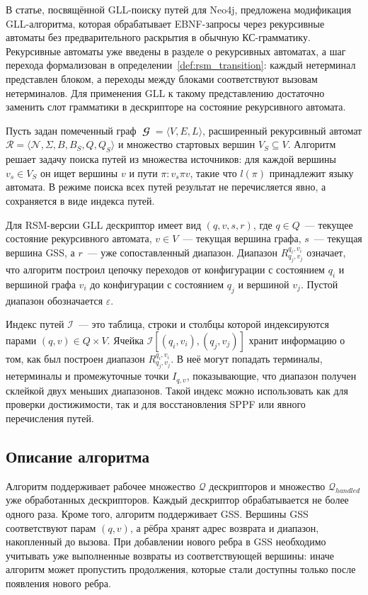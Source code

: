 В статье, посвящённой GLL-поиску путей для Neo4j, предложена модификация GLL-алгоритма, которая обрабатывает EBNF-запросы через рекурсивные автоматы без предварительного раскрытия в обычную КС-грамматику. Рекурсивные автоматы уже введены в разделе о рекурсивных автоматах, а шаг перехода формализован в определении~\ref{def:rsm_transition}: каждый нетерминал представлен блоком, а переходы между блоками соответствуют вызовам нетерминалов. Для применения GLL к такому представлению достаточно заменить слот грамматики в дескрипторе на состояние рекурсивного автомата.

Пусть задан помеченный граф $\mbfscrG = \langle V,E,L\rangle$, расширенный рекурсивный автомат $\mathcal{R} = \langle \mathcal{N},\Sigma,B,B_S,Q,Q_S\rangle$ и множество стартовых вершин $V_S \subseteq V$. Алгоритм решает задачу поиска путей из множества источников: для каждой вершины $v_s \in V_S$ он ищет вершины $v$ и пути $\pi: v_s \pi v$, такие что $l(\pi)$ принадлежит языку автомата. В режиме поиска всех путей результат не перечисляется явно, а сохраняется в виде индекса путей.

Для RSM-версии GLL дескриптор имеет вид $(q,v,s,r)$, где $q \in Q$~--- текущее состояние рекурсивного автомата, $v \in V$~--- текущая вершина графа, $s$~--- текущая вершина GSS, а $r$~--- уже сопоставленный диапазон. Диапазон $R^{q_i,v_i}_{q_j,v_j}$ означает, что алгоритм построил цепочку переходов от конфигурации с состоянием $q_i$ и вершиной графа $v_i$ до конфигурации с состоянием $q_j$ и вершиной $v_j$. Пустой диапазон обозначается $\varepsilon$.

Индекс путей $\mathcal{I}$~--- это таблица, строки и столбцы которой индексируются парами $(q,v) \in Q \times V$. Ячейка $\mathcal{I}[(q_i,v_i),(q_j,v_j)]$ хранит информацию о том, как был построен диапазон $R^{q_i,v_i}_{q_j,v_j}$. В неё могут попадать терминалы, нетерминалы и промежуточные точки $I_{q,v}$, показывающие, что диапазон получен склейкой двух меньших диапазонов. Такой индекс можно использовать как для проверки достижимости, так и для восстановления SPPF или явного перечисления путей.

\subsection{Описание алгоритма}
\label{subsec:CFPQ_GLL_Algorithm}

Алгоритм поддерживает рабочее множество $\mathcal{Q}$ дескрипторов и множество $\mathcal{Q}_{\mathit{handled}}$ уже обработанных дескрипторов. Каждый дескриптор обрабатывается не более одного раза. Кроме того, алгоритм поддерживает GSS. Вершины GSS соответствуют парам $(q,v)$, а рёбра хранят адрес возврата и диапазон, накопленный до вызова. При добавлении нового ребра в GSS необходимо учитывать уже выполненные возвраты из соответствующей вершины: иначе алгоритм может пропустить продолжения, которые стали доступны только после появления нового ребра.


